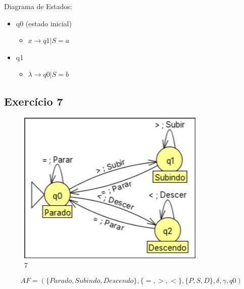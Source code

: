         Diagrama de Estados:
        \begin{itemize}
            \item q0 (estado inicial)
                \begin{itemize}
                    \item $x \to q1 | S = a$
                \end{itemize}
            \item q1
                \begin{itemize}
                    \item $\lambda \to q0 | S = b$
                \end{itemize}
        \end{itemize}

    \subsection{Exercício 7}
        \begin{figure}[H]
            \centering
            \includegraphics[width=0.8\textwidth]{Aula07/Images/Exercicio7.png}
            \caption*{7}
        \end{figure}
        
        \[AF = (\{Parado, Subindo, Descendo\}, \{=, >, <\}, \{P, S, D\}, \delta, \gamma, q0)\]
        
